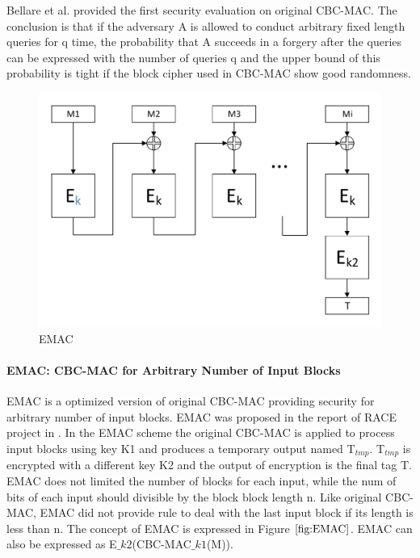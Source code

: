 \documentclass{article}
\begin{document}
Bellare et al. provided the first security evaluation on original CBC-MAC\cite{cbc1994}. The conclusion is that if the adversary A is allowed to conduct arbitrary fixed length queries for q time, the probability that A succeeds in a forgery after the queries can be expressed with the number of queries q and the upper bound of this probability is tight if the block cipher used in CBC-MAC show good randomness.  
\begin{figure}[htbp]
\centering
\includegraphics[scale=0.5]{./diagrams/emac.pdf}
\caption{EMAC}
\label{fig:EMAC}
\end{figure}
\paragraph{EMAC: CBC-MAC for Arbitrary Number of Input Blocks}
EMAC is a optimized version of original CBC-MAC providing security for arbitrary number of input blocks. EMAC was proposed in the report of RACE project in \cite{race}. In the EMAC scheme the original CBC-MAC is applied to process input blocks using key K1 and produces a temporary output named T$_{tmp}$. T$_{tmp}$ is encrypted with a different key K2 and the output of encryption is the final tag T. EMAC does not limited the number of blocks for each input, while the num of bits of each input should divisible by the block block length n. Like original CBC-MAC, EMAC did not provide rule to deal with the last input block if its length is less than n. The concept of EMAC is expressed in Figure $\ref{fig:EMAC}$. EMAC can also be expressed as E$\_{k2}$(CBC-MAC$\_{k1}$(M)). 
\end{document}
